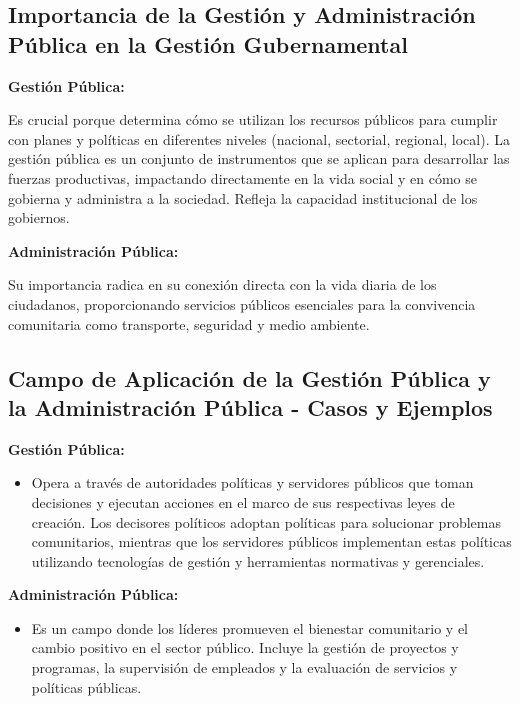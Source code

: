 \documentclass[
  jou,
  floatsintext,
  longtable,
  a4paper,
  nolmodern,
  notxfonts,
  notimes,
  colorlinks=true,linkcolor=blue,citecolor=blue,urlcolor=blue]{apa7}
\providecommand{\tightlist}{%
  \setlength{\itemsep}{0pt}\setlength{\parskip}{0pt}}
\begin{document}
\subsection{Importancia de la Gestión y Administración Pública en la
Gestión
Gubernamental}\label{importancia-de-la-gestiuxf3n-y-administraciuxf3n-puxfablica-en-la-gestiuxf3n-gubernamental}

\textbf{Gestión Pública:}

Es crucial porque determina cómo se utilizan los recursos públicos para
cumplir con planes y políticas en diferentes niveles (nacional,
sectorial, regional, local). La gestión pública es un conjunto de
instrumentos que se aplican para desarrollar las fuerzas productivas,
impactando directamente en la vida social y en cómo se gobierna y
administra a la sociedad. Refleja la capacidad institucional de los
gobiernos.

\textbf{Administración Pública:}

Su importancia radica en su conexión directa con la vida diaria de los
ciudadanos, proporcionando servicios públicos esenciales para la
convivencia comunitaria como transporte, seguridad y medio ambiente.

\subsection{Campo de Aplicación de la Gestión Pública y la
Administración Pública - Casos y
Ejemplos}\label{campo-de-aplicaciuxf3n-de-la-gestiuxf3n-puxfablica-y-la-administraciuxf3n-puxfablica---casos-y-ejemplos}

\textbf{Gestión Pública:}

\begin{itemize}
\tightlist
\item
  Opera a través de autoridades políticas y servidores públicos que
  toman decisiones y ejecutan acciones en el marco de sus respectivas
  leyes de creación. Los decisores políticos adoptan políticas para
  solucionar problemas comunitarios, mientras que los servidores
  públicos implementan estas políticas utilizando tecnologías de gestión
  y herramientas normativas y gerenciales.
\end{itemize}

\textbf{Administración Pública:}

\begin{itemize}
\tightlist
\item
  Es un campo donde los líderes promueven el bienestar comunitario y el
  cambio positivo en el sector público. Incluye la gestión de proyectos
  y programas, la supervisión de empleados y la evaluación de servicios
  y políticas públicas.
\end{itemize}
\end{document}
